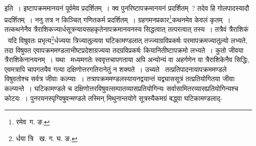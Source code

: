 \documentclass[11pt, openany]{book}
\begin{document}
\indent इति~। इष्टापक्रममानयनं पूर्वमेव प्रदर्शितम्~। क्व पुनरिष्टापक्रमानयनं प्रदर्शितम्~? तदेव हि गोलपादस्यादौ प्रदर्शितम्~। ननु तत्र न किञ्चित् गणितकर्म प्रदर्शितम्~। ग्रहगमनप्रकार\renewcommand{\thefootnote}{१}\footnote{रमेव\textendash\ ग. ङ.}कथनमेव केवलं कृतम्~। तत्कथनेनैव त्रैराशिकज्यार्धसूत्रन्यायसहकृतेनापक्रमानयनस्य सिद्धत्वात् तत्परत्वात् तस्य~। तत्रैवं त्रैराशिकं \textendash\ यदि विषुवतः प्रभृत्य\renewcommand{\thefootnote}{२}\footnote{र्धया त्रि \textendash\ ख. ग. घ. ङ.}र्धज्यया त्रिज्यातुल्यया घटिकामण्डलात् तज्ज्याग्रविप्रकर्षः परमापक्रमज्यातुल्यो लभ्यते, तदा विषुवत एवापक्रममण्डलाभीष्टप्रदेशाग्रज्यया तदग्रविप्रकर्षः कियानितीष्टापक्रमो लभ्यते~। कुतो जीवया त्रैराशिकेनानयनम्~। यथा \textendash\ मध्यमगतेः स्ववृत्तचापगताया अपि अन्योन्यं वा अहर्गणेन वा त्रैराशिकेनैव सिद्धिः, एवमत्रापि चापगतयैव गत्या दक्षिणोत्तरगतिरानेतुं न शक्यते~। उच्यते \textendash\ तत्प्रतिपादनायापक्रममण्डले विषुवतोश्च सर्वत्र जीवाः कल्प्याः~। 
तत्रापक्रममण्डलस्यायनद्वयान्तं यद्व्याससूत्रं तत्प्रतियोगितया जीवाः कल्प्यन्ते~। घटिकामण्डले च दक्षिणोत्तरविषुवत्सम्पातव्यासप्रतियोगिन्यः सर्वासामितरव्यासप्रतियोगिन्यश्च कोटयः~। पुनरयनस्पृग्विषुवन्मण्डले तस्मिन् मिथुनान्तयोगे सूत्रस्यैकमग्रं बद्ध्वा घटिकामण्डलाद्-

\newpage
\end{document}
